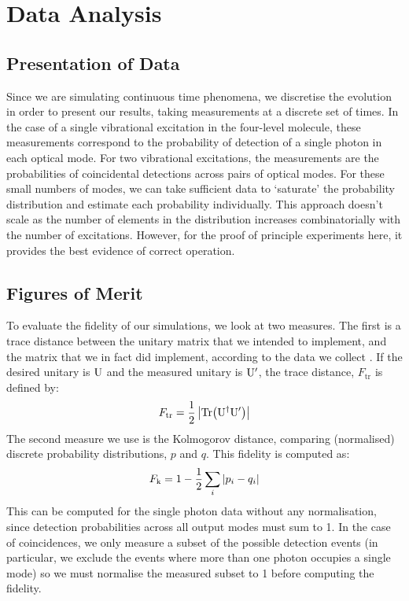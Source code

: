 \section{Data Analysis}
\subsection{Presentation of Data}
Since we are simulating continuous time phenomena, we discretise the evolution
in order to present our results, taking measurements at a discrete set of times.
In the case of a single vibrational excitation in the four-level molecule,
these measurements correspond to the probability of detection of a single
photon in each optical mode. For two vibrational excitations, the measurements
are the probabilities of coincidental detections across pairs of optical modes.
For these small numbers of modes, we can take sufficient data to `saturate' the
probability distribution and estimate each probability individually. This
approach doesn't scale as the number of elements in the distribution increases
combinatorially with the number of excitations. However, for the proof of
principle experiments here, it provides the best evidence of correct operation.

\subsection{Figures of Merit}
To evaluate the fidelity of our simulations, we look at two measures. The first
is a trace distance between the unitary matrix that we intended to implement,
and the matrix that we in fact did implement, according to the data we collect
\cite{sst}. If the desired unitary is \(\mathrm{U}\) and the measured unitary
is \(\mathrm{U^{\prime}}\), the trace distance, \(F_{\mathrm{tr}}\) is defined by:
\begin{equation}
  F_{\mathrm{tr}}=\frac{1}{2}\left|\mathrm{Tr}\!\left(\mathrm{U}^{\dagger}{\mathrm{U}^{\prime}}\right)\right|
\end{equation}
The second measure we use is the Kolmogorov distance, comparing (normalised)
discrete probability distributions, \(p\) and \(q\). This fidelity is computed
as:
\begin{equation}
  F_{\mathrm{k}}=1-\frac{1}{2}\sum_{i}\left|p_{i}-q_{i}\right|
\end{equation}
This can be computed for the single photon data without any normalisation, since
detection probabilities across all output modes must sum to 1. In the case of
coincidences, we only measure a subset of the possible detection events (in
particular, we exclude the events where more than one photon occupies a single
mode) so we must normalise the measured subset to 1 before computing the
fidelity.

